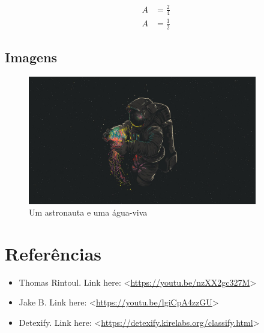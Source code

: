 \documentclass[a4paper, 12pt]{article}
\begin{document}
\begin{equation}
  \begin{split}
    A & = \frac{2}{4} \\
    A & = \frac{1}{2}
  \end{split}
\end{equation}

\subsection{Imagens}
\begin{figure}[h]
  \centering
  \includegraphics[width=10cm]{images/astronaut.png}
  \caption{\small{Um astronauta e uma água-viva}}
  \label{Astronauta}
\end{figure}

\newpage


\printbibliography %

\section*{Referências}
\begin{itemize} %
  \item Thomas Rintoul. Link here: <\url{https://youtu.be/nzXX2gc327M}>
  \item Jake B. Link here: <\url{https://youtu.be/lgiCpA4zzGU}>
  \item Detexify. Link here: <\url{https://detexify.kirelabs.org/classify.html}>
\end{itemize}
\end{document}
